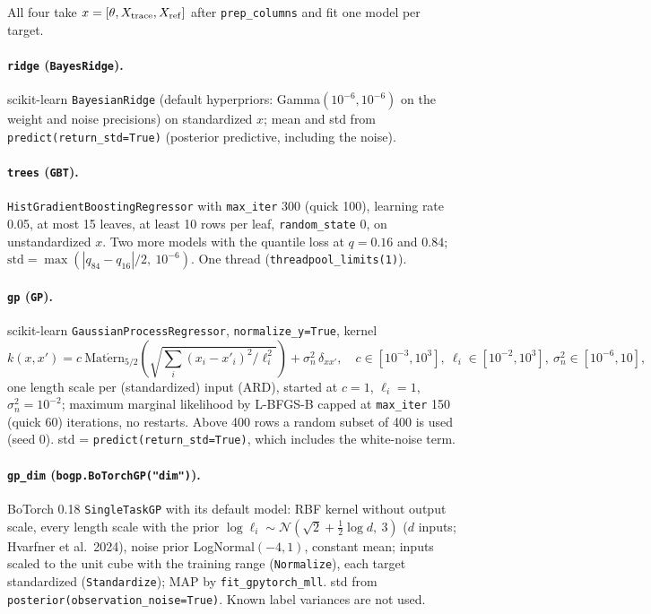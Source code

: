 \documentclass[10pt]{article}
\newcommand{\code}[1]{\texttt{#1}}
\begin{document}
All four take $x = [\theta, X_{\rm trace}, X_{\rm ref}]$ after \code{prep\_columns} and fit one model per target.

\paragraph{\code{ridge} (\code{BayesRidge}).} scikit-learn \code{BayesianRidge} (default hyperpriors: Gamma$(10^{-6},
10^{-6})$ on the weight and noise precisions) on standardized $x$; mean and std from \code{predict(return\_std=True)}
(posterior predictive, including the noise).

\paragraph{\code{trees} (\code{GBT}).} \code{HistGradientBoostingRegressor} with \code{max\_iter} 300 (quick 100),
learning rate 0.05, at most 15 leaves, at least 10 rows per leaf, \code{random\_state} 0, on unstandardized $x$. Two
more models with the quantile loss at $q = 0.16$ and $0.84$; $\mathrm{std} = \max(|q_{84} - q_{16}|/2,\ 10^{-6})$.
One thread (\code{threadpool\_limits(1)}).

\paragraph{\code{gp} (\code{GP}).} scikit-learn \code{GaussianProcessRegressor}, \code{normalize\_y=True}, kernel
\[ k(x,x') = c\ \mathrm{Mat\acute ern}_{5/2}\!\left(\sqrt{\textstyle\sum_i (x_i - x'_i)^2/\ell_i^2}\right) + \sigma_n^2\,\delta_{xx'},
\quad c \in [10^{-3}, 10^3],\ \ell_i \in [10^{-2}, 10^3],\ \sigma_n^2 \in [10^{-6}, 10],\]
one length scale per (standardized) input (ARD), started at $c = 1$, $\ell_i = 1$, $\sigma_n^2 = 10^{-2}$; maximum
marginal likelihood by L-BFGS-B capped at \code{max\_iter} 150 (quick 60) iterations, no restarts. Above 400 rows a
random subset of 400 is used (seed 0). std = \code{predict(return\_std=True)}, which includes the white-noise term.

\paragraph{\code{gp\_dim} (\code{bogp.BoTorchGP("dim")}).} BoTorch 0.18 \code{SingleTaskGP} with its default model:
RBF kernel without output scale, every length scale with the prior $\log \ell_i \sim \mathcal N(\sqrt2 + \tfrac12\log d,
\ 3)$ ($d$ inputs; Hvarfner et al.\ 2024), noise prior LogNormal$(-4, 1)$, constant mean; inputs scaled to the unit cube
with the training range (\code{Normalize}), each target standardized (\code{Standardize}); MAP by
\code{fit\_gpytorch\_mll}. std from \code{posterior(observation\_noise=True)}. Known label variances are not used.
\end{document}
